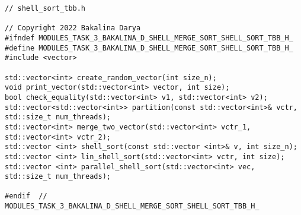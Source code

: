 \documentclass{report}
\begin{document}
\begin{lstlisting}
// shell_sort_tbb.h

// Copyright 2022 Bakalina Darya
#ifndef MODULES_TASK_3_BAKALINA_D_SHELL_MERGE_SORT_SHELL_SORT_TBB_H_
#define MODULES_TASK_3_BAKALINA_D_SHELL_MERGE_SORT_SHELL_SORT_TBB_H_
#include <vector>

std::vector<int> create_random_vector(int size_n);
void print_vector(std::vector<int> vector, int size);
bool check_equality(std::vector<int> v1, std::vector<int> v2);
std::vector<std::vector<int>> partition(const std::vector<int>& vctr, std::size_t num_threads);
std::vector<int> merge_two_vector(std::vector<int> vctr_1, std::vector<int> vctr_2);
std::vector <int> shell_sort(const std::vector <int>& v, int size_n);
std::vector <int> lin_shell_sort(std::vector<int> vctr, int size);
std::vector <int> parallel_shell_sort(std::vector<int> vec, std::size_t num_threads);

#endif  // MODULES_TASK_3_BAKALINA_D_SHELL_MERGE_SORT_SHELL_SORT_TBB_H_
\end{lstlisting}
\end{document}
